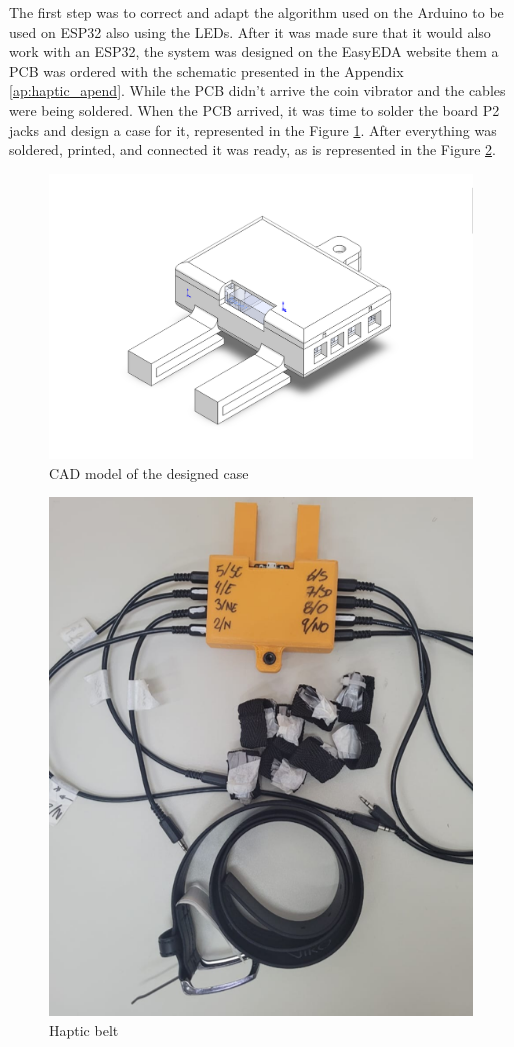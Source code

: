  The first step was to correct and adapt the algorithm used on the Arduino to be used on ESP32 also using the LEDs. After it was made sure that it would also work with an ESP32, the system was designed on the EasyEDA website \cite{easyeda} them a PCB was ordered with the schematic presented in the Appendix \ref{ap:haptic_apend}. While the PCB didn't arrive the coin vibrator and the cables were being soldered. When the PCB arrived, it was time to solder the board P2 jacks and design a case for it, represented in the Figure \ref{fig:case_cinto}. After everything was soldered, printed, and connected it was ready, as is represented in the Figure \ref{fig:cinto_haptico}.
 
 \begin{figure}[!htb]
     \centering
     \includegraphics[width = 0.8\linewidth]{Cinto/Case Cinto.png}
     \caption{CAD model of the designed case}
     \label{fig:case_cinto}
 \end{figure}
 \begin{figure}[!htb]
     \centering
     \includegraphics[width = 0.8\linewidth]{Cinto/Cinto Haptico.png}
     \caption{Haptic belt}
     \label{fig:cinto_haptico}
 \end{figure}
 
